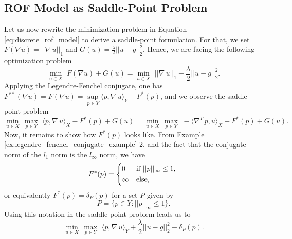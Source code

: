     \subsection{ROF Model as Saddle-Point Problem} %
    \label{sub:rof_model_as_saddle_point_problem}

        Let us now rewrite the minimization problem in Equation \ref{eq:discrete_rof_model} to derive a saddle-point formulation. For that, we set $F(\nabla u) = ||\nabla \, u||_{1}$ and $G(u) = \frac{\lambda}{2} ||u - g||_{2}^{2}$. Hence, we are facing the following optimization problem
            \begin{equation}
                \min_{u \in X}\,\, F(\nabla u) + G(u) = \min_{u \in X}\,\, ||\nabla \, u||_{1} + \frac{\lambda}{2} ||u - g||_{2}^{2}.
            \label{eq:primal_rof_problem}
            \end{equation}
        Applying the Legendre-Fenchel conjugate, one has $F^{\ast\ast}(\nabla u) = F(\nabla u) = \sup\limits_{p \in Y} \langle p, \nabla \, u \rangle_{Y} - F^{\ast}(p)$, and we observe the saddle-point problem
            \begin{equation}
                \min_{u \in X}\, \max_{p \in Y}\,\, \langle p, \nabla \, u \rangle_{X} - F^{\ast}(p) + G(u) = \min_{u \in X}\, \max_{p \in Y}\,\, -\langle \nabla^{T}\,p, u \rangle_{X} - F^{\ast}(p) + G(u).
            \end{equation}
        Now, it remains to show how $F^{\ast}(p)$ looks like. From Example \ref{ex:legendre_fenchel_conjugate_example} 2. and the fact that the conjugate norm of the $l_{1}$ norm is the $l_{\infty}$ norm, we have
            \begin{equation}
                F^{\ast}(p) =
                    \begin{dcases*}
                        0 & \textnormal{if $||p||_{\infty} \le 1$,} \\
                        \infty & \textnormal{else},
                    \end{dcases*}
                \label{eq:rof_f_star}
            \end{equation}
        or equivalently $F^{\ast}(p) = \delta_{P}(p)$ for a set $P$ given by
            \begin{equation}
                P = \big\{ p \in Y : ||p||_{\infty} \le 1 \big\}.
                \label{eq:the_set_P}
            \end{equation}
        Using this notation in the saddle-point problem leads us to
            \begin{equation}
                \min_{u \in X}\, \max_{p \in Y}\,\, \langle p, \nabla\, u \rangle_{Y} + \frac{\lambda}{2} ||u - g||_{2}^{2} - \delta_{P}(p).
            \label{eq:primal_dual_rof_problem}
            \end{equation}
